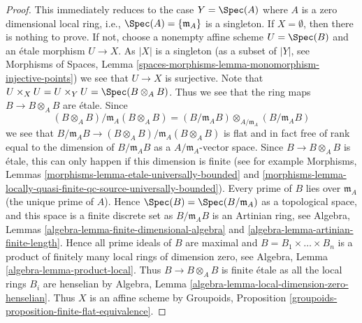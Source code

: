\begin{proof}
This immediately reduces to the case $Y = \Spec(A)$ where
$A$ is a zero dimensional local ring, i.e.,
$\Spec(A) = \{\mathfrak m_A\}$
is a singleton. If $X = \emptyset$, then there is nothing to prove.
If not, choose a nonempty affine scheme $U = \Spec(B)$
and an \'etale morphism $U \to X$. As $|X|$ is a singleton (as a
subset of $|Y|$, see
Morphisms of Spaces, Lemma
\ref{spaces-morphisms-lemma-monomorphism-injective-points})
we see that $U \to X$ is surjective. Note that
$U \times_X U = U \times_Y U = \Spec(B \otimes_A B)$.
Thus we see that the ring maps $B \to B \otimes_A B$ are \'etale.
Since
$$
(B \otimes_A B)/\mathfrak m_A(B \otimes_A B)
=
(B/\mathfrak m_AB) \otimes_{A/\mathfrak m_A} (B/\mathfrak m_AB)
$$
we see that
$B/\mathfrak m_AB \to (B \otimes_A B)/\mathfrak m_A(B \otimes_A B)$
is flat and in fact free of rank equal to the dimension of
$B/\mathfrak m_AB$ as a $A/\mathfrak m_A$-vector space. Since
$B \to B \otimes_A B$ is \'etale, this can only happen if this
dimension is finite (see for example
Morphisms, Lemmas \ref{morphisms-lemma-etale-universally-bounded} and
\ref{morphisms-lemma-locally-quasi-finite-qc-source-universally-bounded}).
Every prime of $B$ lies over $\mathfrak m_A$ (the unique prime of $A$).
Hence $\Spec(B) = \Spec(B/\mathfrak m_A)$ as a topological
space, and this space is a finite discrete set as $B/\mathfrak m_A B$
is an Artinian ring, see
Algebra, Lemmas \ref{algebra-lemma-finite-dimensional-algebra} and
\ref{algebra-lemma-artinian-finite-length}.
Hence all prime ideals of $B$ are maximal and
$B = B_1 \times \ldots \times B_n$ is a product of finitely many
local rings of dimension zero, see
Algebra, Lemma \ref{algebra-lemma-product-local}.
Thus $B \to B \otimes_A B$ is finite \'etale as all the local rings
$B_i$ are henselian by
Algebra, Lemma \ref{algebra-lemma-local-dimension-zero-henselian}.
Thus $X$ is an affine scheme by
Groupoids, Proposition \ref{groupoids-proposition-finite-flat-equivalence}.
\end{proof}



























